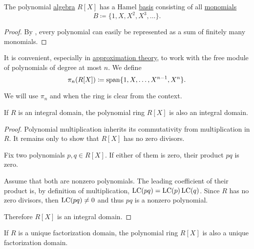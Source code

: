\begin{proposition}\label{thm:polynomial_algebra_basis}
  The polynomial \hyperref[def:algebra_of_polynomials]{algebra} \( R[X] \) has a Hamel \hyperref[def:left_module_hamel_basis]{basis} consisting of all \hyperref[def:polynomial/monomial]{monomials}
  \begin{equation*}
    B \coloneqq \{ 1, X, X^2, X^3, \ldots \}.
  \end{equation*}
\end{proposition}
\begin{proof}
  By , every polynomial can easily be represented as a sum of finitely many monomials.
\end{proof}

\begin{definition}\label{def:polynomial_free_module}
  It is convenient, especially in \hyperref[sec:approximation_theory]{approximation theory}, to work with the free module of polynomials of degree at most \( n \). We define
  \begin{equation*}
    \pi_n(R[X]) \coloneqq \operatorname{span} \{ 1, X, \ldots, X^{n-1}, X^n \}.
  \end{equation*}

  We will use \( \pi_n \) and when the ring is clear from the context.
\end{definition}

\begin{proposition}\label{thm:polynomials_over_integral_domain_are_integral_domain}
  If \( R \) is an integral domain, the polynomial ring \( R[X] \) is also an integral domain.
\end{proposition}
\begin{proof}
  Polynomial multiplication inherits its commutativity from multiplication in \( R \). It remains only to show that \( R[X] \) has no zero divisors.

  Fix two polynomials \( p, q \in R[X] \). If either of them is zero, their product \( pq \) is zero.

  Assume that both are nonzero polynomials. The leading coefficient of their product is, by definition of multiplication, \( \operatorname{LC}(pq) = \operatorname{LC}(p) \operatorname{LC}(q) \). Since \( R \) has no zero divisors, then \( \operatorname{LC}(pq) \neq 0 \) and thus \( pq \) is a nonzero polynomial.

  Therefore \( R[X] \) is an integral domain.
\end{proof}

\begin{proposition}\label{thm:polynomials_over_unique_factorization_domain_are_unique_factorization_domain}
  If \( R \) is a unique factorization domain, the polynomial ring \( R[X] \) is also a unique factorization domain.
\end{proposition}

